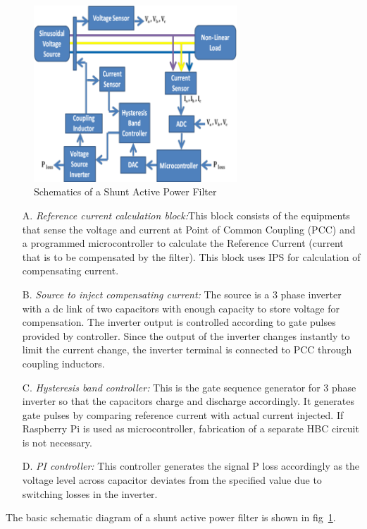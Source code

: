 \documentclass[journal,twoside]{IEEEtran}
\begin{document}
\begin{figure}[!ht]
\centering
\includegraphics[width=3in]{1}
\caption{Schematics of a Shunt Active Power Filter}
\label{f1}
\end{figure}
\begin{itemize}
\item[A.] \emph{Reference current calculation block:}This block
consists of the equipments that sense the voltage and
current at Point of Common Coupling (PCC) and a programmed microcontroller to
calculate the Reference Current (current that is to be
compensated by the filter). This block uses IPS for
calculation of compensating current.
\item[B.]\emph{Source to inject compensating current: }The source is
a 3 phase inverter with a dc link of two capacitors
with enough capacity to store voltage for
compensation. The inverter output is controlled
according to gate pulses provided by controller. Since
the output of the inverter changes instantly to limit
the current change, the inverter terminal is connected
to PCC through coupling inductors.
\item[C.]\emph{Hysteresis band controller:} This is the gate sequence
generator for 3 phase inverter so that the capacitors
charge and discharge accordingly. It generates gate
pulses by comparing reference current with actual
current injected. If Raspberry Pi is used as
microcontroller, fabrication of a separate HBC circuit
is not necessary.
\item[D.]\emph{PI controller:} This controller generates the signal
P loss accordingly as the voltage level across capacitor
deviates from the specified value due to switching
losses in the inverter.
\end{itemize}

The basic schematic diagram of a shunt active power
filter is shown in fig~\ref{f1}.


\newpage
\end{document}
